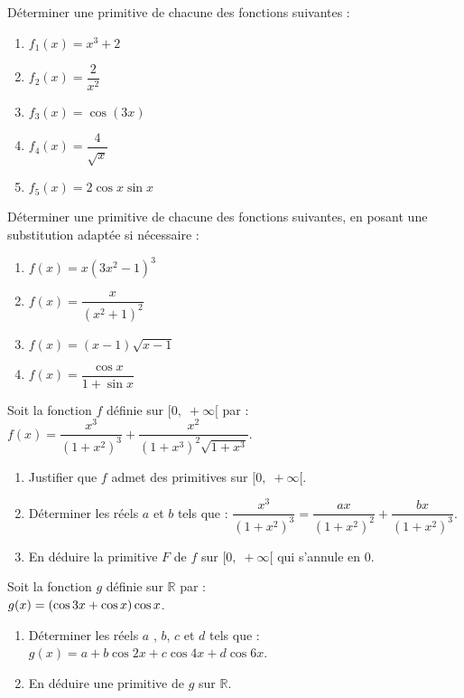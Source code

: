 



 \summary{}
 
\begin{exercice}
Déterminer une primitive de chacune des fonctions suivantes :
\begin{enumerate}
  \item $f_1(x) = x^3+2$
  \item $f_2(x) = \dfrac{2}{x^2}$
  \item $f_3(x) = \cos(3x)$
  \item $f_4(x) = \dfrac{4}{\sqrt{x}}$
  \item $f_5(x) = 2\cos x \sin x$
\end{enumerate}
\end{exercice}

\begin{exercice}
Déterminer une primitive de chacune des fonctions suivantes, en posant une substitution adaptée si nécessaire :
\begin{enumerate}
  \item $f(x) = x(3x^2 - 1)^3$
  \item $f(x) = \dfrac{x}{(x^2 + 1)^2}$
  \item $f(x) = (x- 1)\sqrt{x-1}$
  \item $f(x) = \dfrac{\cos x}{1 + \sin x}$
\end{enumerate}
\end{exercice}
\begin{exercice}
 Soit la fonction $ f $  définie sur $  [0,\; +\infty[ $  par : \; $ f(x)=\dfrac{x^3}{(1+x^2)^3}+ \dfrac{x^2}{(1+x^3)^2\sqrt{1+x^3}} $.
\begin{enumerate}
\item Justifier que $ f $ admet des primitives sur $  [0,\; +\infty[ $.
\item Déterminer les réels $a $ et $ b$ tels que :\; $ \dfrac{x^3}{(1+x^2)^3}=\dfrac{ax}{(1+x^2)^2}+\dfrac{bx}{(1+x^2)^3} $.
\item En déduire la primitive $ F $ de $ f $  sur $  [0,\; +\infty[ $ qui s'annule en 0.
\end{enumerate}
\end{exercice}
\begin{exercice}
Soit la fonction $ g $  définie sur $ \mathbb{R} $  par : \\ $ g(x)=\left(\cos 3x  +\cos x\right)\cos x $.
\begin{enumerate}
\item Déterminer les réels $a $ , $ b $, $ c $ et $ d$ tels que :\; $ g(x)=a+b\cos 2x +c\cos 4x +d\cos 6x$.
\item En déduire une primitive de $ g $  sur $\mathbb{R} $.  
\end{enumerate}
\end{exercice}

